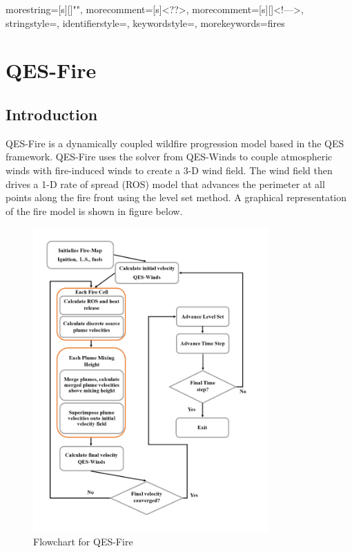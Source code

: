  {
  morestring=[s][\color{mauve}]{"}{"},
  morecomment=[s]{<?}{?>},
  morecomment=[s][\color{dkgreen}]{<!--}{-->},
  stringstyle=\color{black},
  identifierstyle=\color{lightblue},
  keywordstyle=\color{red},
  morekeywords={fires}%
}

\chapter{QES-Fire}

\section{Introduction}

QES-Fire \cite{Moody2022,Moody2023} is a dynamically coupled wildfire progression model based in the QES framework. QES-Fire uses the solver from QES-Winds to couple atmospheric winds with fire-induced winds to create a 3-D wind field. The wind field then drives a 1-D rate of spread (ROS) model that advances the perimeter at all points along the fire front using the level set method. A graphical representation of the fire model is shown in figure below.   


\begin{figure}[H]
\includegraphics[width=9cm]{Images/Fire-Flowchart.png}
\caption{Flowchart for QES-Fire}
\end{figure}


